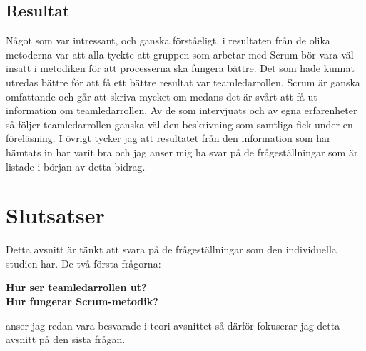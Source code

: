 \subsection{Resultat}
Något som var intressant, och ganska förståeligt, i resultaten från de olika metoderna var att alla tyckte att gruppen som arbetar med Scrum bör vara väl insatt i metodiken för att processerna ska fungera bättre.
Det som hade kunnat utredas bättre för att få ett bättre resultat var teamledarrollen. 
Scrum är ganska omfattande och går att skriva mycket om medans det är svårt att få ut information om teamledarrollen. 
Av de som intervjuats och av egna erfarenheter så följer teamledarrollen ganska väl den beskrivning som samtliga fick under en föreläsning. 
I övrigt tycker jag att resultatet från den information som har hämtats in har varit bra och jag anser mig ha svar på de frågeställningar som är listade i början av detta bidrag.

\section{Slutsatser}
Detta avsnitt är tänkt att svara på de frågeställningar som den individuella studien har. De två första frågorna:

\textbf{Hur ser teamledarrollen ut?}\\
\textbf{Hur fungerar Scrum-metodik?}

anser jag redan vara besvarade i teori-avsnittet så därför fokuserar jag detta avsnitt på den sista frågan.

